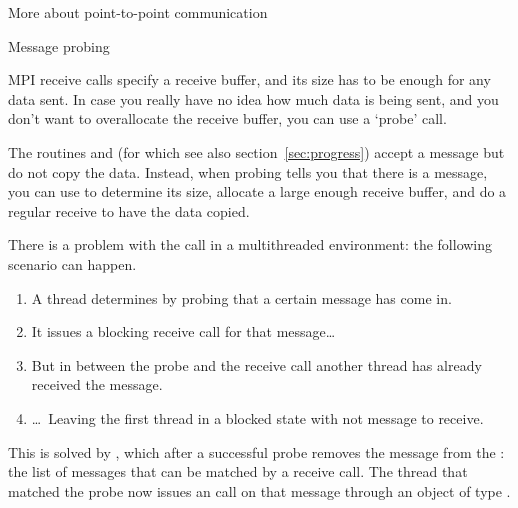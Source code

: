 




 {More about point-to-point communication}

 {Message probing}
\label{sec:mpi-probe}

MPI receive calls specify a receive buffer, and its size has to be
enough for any data sent. In case you really have no idea how much data
is being sent, and you don't want to overallocate the receive buffer,
you can use a `probe' call.

The routines  and 
(for which see also section~\ref{sec:progress})
accept a message but do not copy the data.
Instead, when probing tells you that there is a
message, you can use  to determine its size,
allocate a large enough receive buffer, and do a regular receive to
have the data copied.


There is a problem with the  call in a
multithreaded environment: the following scenario can happen.
\begin{enumerate}
\item A thread determines by probing that a certain message has come
  in.
\item It issues a blocking receive call for that message\dots
\item But in between the probe and the receive call another thread
  has already received the message.
\item \dots~Leaving the first thread in a blocked state with not
  message to receive.
\end{enumerate}
This is solved by , which after a successful
probe removes the message from the : the
list of messages that can be matched by a receive call. The thread
that matched the probe now issues an  call on
that message through an object of type .

